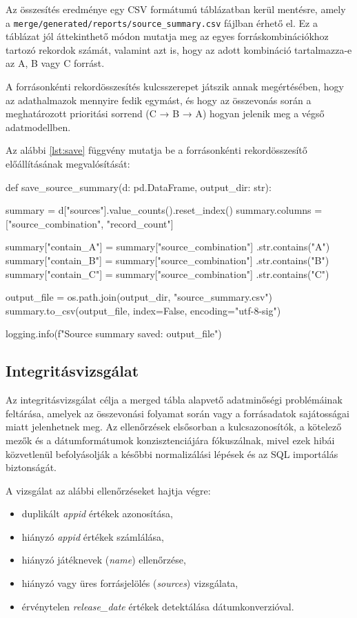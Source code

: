 Az összesítés eredménye egy CSV formátumú táblázatban kerül mentésre, amely a \texttt{merge/generated/reports/source\_summary.csv} fájlban érhető el. Ez a táblázat jól áttekinthető módon mutatja meg az egyes forráskombinációkhoz tartozó rekordok számát, valamint azt is, hogy az adott kombináció tartalmazza-e az A, B vagy C forrást.

A forrásonkénti rekordösszesítés kulcsszerepet játszik annak megértésében, hogy az adathalmazok mennyire fedik egymást, és hogy az összevonás során a meghatározott prioritási sorrend (C → B → A) hogyan jelenik meg a végső adatmodellben.

Az alábbi \ref{lst:save} függvény mutatja be a forrásonkénti rekordösszesítő előállításának megvalósítását:

\begin{python}[caption={Forrásonkénti rekordösszesítő előállításának megvalósítása},captionpos=b,label={lst:save}]
def save_source_summary(d: pd.DataFrame, output_dir: str):

    summary = d["sources"].value_counts().reset_index()
    summary.columns = ["source_combination", "record_count"]

    summary["contain_A"] = summary["source_combination"]
    .str.contains("A")
    summary["contain_B"] = summary["source_combination"]
    .str.contains("B")
    summary["contain_C"] = summary["source_combination"]
    .str.contains("C")

    output_file = os.path.join(output_dir, "source_summary.csv")
    summary.to_csv(output_file, index=False, encoding="utf-8-sig")

    logging.info(f"Source summary saved: {output_file}")
\end{python}

\subsection{Integritásvizsgálat}

Az integritásvizsgálat célja a merged tábla alapvető adatminőségi problémáinak feltárása, amelyek az összevonási folyamat során vagy a forrásadatok sajátosságai miatt jelenhetnek meg. Az ellenőrzések elsősorban a kulcsazonosítók, a kötelező mezők és a dátumformátumok konzisztenciájára fókuszálnak, mivel ezek hibái közvetlenül befolyásolják a későbbi normalizálási lépések és az SQL importálás biztonságát.

A vizsgálat az alábbi ellenőrzéseket hajtja végre:
\begin{itemize}
    \item duplikált \textit{appid} értékek azonosítása,
    \item hiányzó \textit{appid} értékek számlálása,
    \item hiányzó játéknevek (\textit{name}) ellenőrzése,
    \item hiányzó vagy üres forrásjelölés (\textit{sources}) vizsgálata,
    \item érvénytelen \textit{release\_date} értékek detektálása dátumkonverzióval.
\end{itemize}

